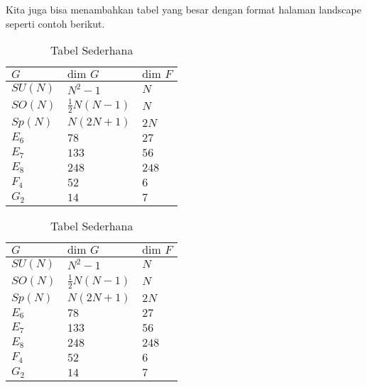 Kita juga bisa menambahkan tabel yang besar dengan format halaman landscape seperti contoh berikut.
\begin{sidewaysfigure}[htbp]
	\begin{table}[H]
		\caption{Tabel Sederhana}
		\label{co:tabel}
		\begin{center}
			\begin{tabularx}{0.8\textwidth} {
					|>{\raggedright\arraybackslash}X
					|>{\raggedright\arraybackslash}X
					|>{\raggedright\arraybackslash}X
					|}
				\hline
				$G$     & $\text{dim }G$      & $\text{dim }F$ \\
				\hline
				$SU(N)$ & $N^2 -1$            & $N$            \\
				$SO(N)$ & $\frac{1}{2}N(N-1)$ & $N$            \\
				$Sp(N)$ & $N(2N+1)$           & $2N$           \\
				$E_6$   & $78$                & $27$           \\
				$E_7$   & $133$               & $56$           \\
				$E_8$   & $248$               & $248$          \\
				$F_4$   & $52$                & $6$            \\
				$G_2$   & $14$                & $7$            \\
				\hline
			\end{tabularx}
		\end{center}
	\end{table}
\end{sidewaysfigure}

\begin{table}[H]
	\caption{Tabel Sederhana}
	\label{co:tabel}
	\begin{center}
		\begin{tabularx}{0.8\textwidth} {
				|>{\raggedright\arraybackslash}X
				|>{\raggedright\arraybackslash}X
				|>{\raggedright\arraybackslash}X
				|}
			\hline
			$G$     & $\text{dim }G$      & $\text{dim }F$ \\
			\hline
			$SU(N)$ & $N^2 -1$            & $N$            \\
			$SO(N)$ & $\frac{1}{2}N(N-1)$ & $N$            \\
			$Sp(N)$ & $N(2N+1)$           & $2N$           \\
			$E_6$   & $78$                & $27$           \\
			$E_7$   & $133$               & $56$           \\
			$E_8$   & $248$               & $248$          \\
			$F_4$   & $52$                & $6$            \\
			$G_2$   & $14$                & $7$            \\
			\hline
		\end{tabularx}
	\end{center}
\end{table}

